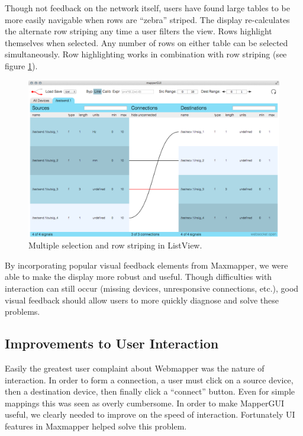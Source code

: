 Though not feedback on the network itself, users have found large tables to be more easily navigable when rows are ``zebra'' striped. The display re-calculates the alternate row striping any time a user filters the view. Rows highlight themselves when selected. Any number of rows on either table can be selected simultaneously. Row highlighting works in combination with row striping (see figure \ref{fig:row_striping}).

\begin{figure}[!h]
	\centering
	\includegraphics[width=1\textwidth]{figures/row_striping}
	\caption{Multiple selection and row striping in ListView.}
	\label{fig:row_striping}
\end{figure}

By incorporating popular visual feedback elements from Maxmapper, we were able to make the display more robust and useful. Though difficulties with interaction can still occur (missing devices, unresponsive connections, etc.), good visual feedback should allow users to more quickly diagnose and solve these problems.


	\subsection{Improvements to User Interaction} %
	\label{sub:improvements_to_user_interaction}

Easily the greatest user complaint about Webmapper was the nature of interaction. In order to form a connection, a user must click on a source device, then a destination device, then finally click a ``connect'' button. Even for simple mappings this was seen as overly cumbersome. In order to make MapperGUI useful, we clearly needed to improve on the speed of interaction. Fortunately UI features in Maxmapper helped solve this problem.
	
